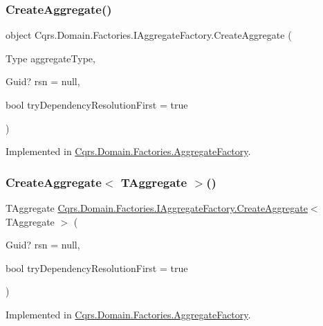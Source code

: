 \subsubsection{\texorpdfstring{Create\+Aggregate()}{CreateAggregate()}}
{\footnotesize\ttfamily object Cqrs.\+Domain.\+Factories.\+I\+Aggregate\+Factory.\+Create\+Aggregate (\begin{DoxyParamCaption}\item[{Type}]{aggregate\+Type,  }\item[{Guid?}]{rsn = {\ttfamily null},  }\item[{bool}]{try\+Dependency\+Resolution\+First = {\ttfamily true} }\end{DoxyParamCaption})}



Implemented in \hyperlink{classCqrs_1_1Domain_1_1Factories_1_1AggregateFactory_aa60839e14ef01b3971067e1f154ee6b4}{Cqrs.\+Domain.\+Factories.\+Aggregate\+Factory}.

\mbox{\label{interfaceCqrs_1_1Domain_1_1Factories_1_1IAggregateFactory_aa9723aadb2dfeae42287520d76f3a397}} 
\subsubsection{\texorpdfstring{Create\+Aggregate$<$ T\+Aggregate $>$()}{CreateAggregate< TAggregate >()}}
{\footnotesize\ttfamily T\+Aggregate \hyperlink{interfaceCqrs_1_1Domain_1_1Factories_1_1IAggregateFactory_a0013390ede7737375e7dbcffcadf3a12}{Cqrs.\+Domain.\+Factories.\+I\+Aggregate\+Factory.\+Create\+Aggregate}$<$ T\+Aggregate $>$ (\begin{DoxyParamCaption}\item[{Guid?}]{rsn = {\ttfamily null},  }\item[{bool}]{try\+Dependency\+Resolution\+First = {\ttfamily true} }\end{DoxyParamCaption})}



Implemented in \hyperlink{classCqrs_1_1Domain_1_1Factories_1_1AggregateFactory_aa13b39399abe7db18005573c28ab3d2a}{Cqrs.\+Domain.\+Factories.\+Aggregate\+Factory}.

